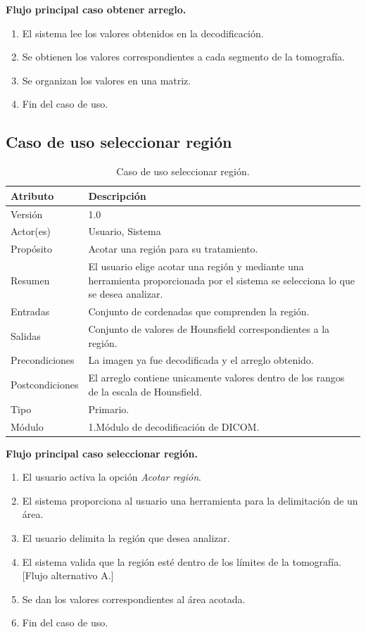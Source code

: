 \documentclass[12pt]{report}
\begin{document}
\textbf{Flujo principal caso obtener arreglo. }
\begin{enumerate}
\item El sistema lee los valores obtenidos en la decodificación.
\item Se obtienen los valores correspondientes a cada segmento de la tomografía.
\item Se organizan los valores en una matriz.
\item Fin del caso de uso.
\end{enumerate}

\subsection{Caso de uso seleccionar región}
\begin{table}[H]
\begin{center}
\begin{tabular}{|p{25mm}|p{60mm}|}
\hline
Atributo & Descripción\\
\hline \hline 
Versión & 1.0\\
\hline
Actor(es) & Usuario, Sistema\\
\hline
Propósito & Acotar una región para su tratamiento.\\
\hline
Resumen & El usuario elige acotar una región y mediante una herramienta proporcionada por el sistema se selecciona lo que se desea analizar.\\
\hline
Entradas & Conjunto de cordenadas que comprenden la región.\\
\hline
Salidas & Conjunto de valores de Hounsfield correspondientes a la región.\\
\hline
Precondiciones & La imagen ya fue decodificada y el arreglo obtenido.\\
\hline
Postcondiciones & El arreglo contiene unicamente valores dentro de los rangos de la escala de Hounsfield.\\
\hline
Tipo & Primario.\\
\hline 
Módulo &  1.Módulo de decodificación de DICOM.\\
\hline
\end{tabular}
\caption{Caso de uso seleccionar región.}
\end{center}
\end{table}

\textbf{Flujo principal caso seleccionar región. }
\begin{enumerate}
\item El usuario activa la opción \textit{Acotar región}.
\item El sistema proporciona al usuario una herramienta para la delimitación de un área.
\item El usuario delimita la región que desea analizar.
\item El sistema valida que la región esté dentro de los límites de la tomografía.[Flujo alternativo A.]
\item Se dan los valores correspondientes al área acotada.
\item Fin del caso de uso.
\end{enumerate}
\end{document}
